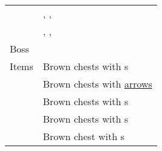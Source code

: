 \begin{longtable}{ l p{9cm} }
	\nameref{monster:sparna}
	& \nameref{monster:sparna}, \nameref{monster:sparna}, \nameref{monster:land_turtle} \\
	& \nameref{monster:sparna}, \nameref{monster:sparna}, \nameref{monster:sparna} \\
	Boss & \nameref{monster:squidite} \\
	Items
	& Brown chests with \nameref{weapon:bomb}s \\
	& Brown chests with \hyperref[weapon:bow_of_grace]{arrows} \\
	& Brown chests with \nameref{item:heal_potion}s \\
	& Brown chests with \nameref{item:cure_potion}s \\
	& Brown chest with \nameref{item:refresher}s
\end{longtable}
